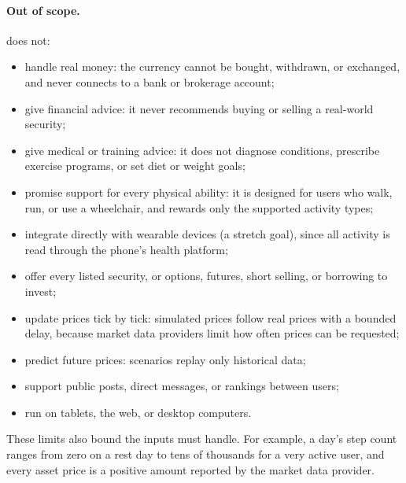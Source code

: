 \documentclass[12pt]{article}
\begin{document}
\paragraph{Out of scope.} \progname{} does not:
\begin{itemize}
  \item handle real money: the currency cannot be bought, withdrawn, or
        exchanged, and \progname{} never connects to a bank or brokerage account;
  \item give financial advice: it never recommends buying or selling a
        real-world security;
  \item give medical or training advice: it does not diagnose conditions,
        prescribe exercise programs, or set diet or weight goals;
  \item promise support for every physical ability: it is designed for users
        who walk, run, or use a wheelchair, and rewards only the supported
        activity types;
  \item integrate directly with wearable devices (a stretch goal), since all
        activity is read through the phone's health platform;
  \item offer every listed security, or options, futures, short selling, or
        borrowing to invest;
  \item update prices tick by tick: simulated prices follow real prices with a
        bounded delay, because market data providers limit how often prices can be
        requested;
  \item predict future prices: scenarios replay only historical data;
  \item support public posts, direct messages, or rankings between users;
  \item run on tablets, the web, or desktop computers.
\end{itemize}

These limits also bound the inputs \progname{} must handle. For example, a
day's step count ranges from zero on a rest day to tens of thousands for a very
active user, and every asset price is a positive amount reported by the market
data provider.
\end{document}
